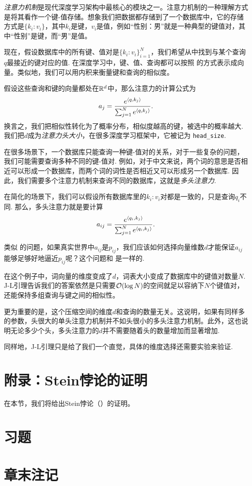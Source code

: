 \begin{example}[多头注意力]
\emph{注意力机制}是现代深度学习架构中最核心的模块之一。注意力机制的一种理解方式是将其看作一个键-值存储。想象我们把数据都存储到了一个数据库中，它的存储方式是$\{k_i:v_i\}$，其中$k_i$是键，$v_i$是值，例如“性别：男”就是一种典型的键值对，其中“性别”是键，而“男”是值。

现在，假设数据库中的所有键、值对是$\{k_i:v_i\}_{i=1}^N$，我们希望从中找到与某个查询$q$最接近的键对应的值. 在深度学习中，键、值、查询都可以按照 的方式表示成向量。类似地，我们可以用内积来衡量键和查询的相似度。

假设这些查询和键的向量都处在$\mathbb{R}^d$中，那么注意力的计算公式为
\[
    a_j = \frac{e^{\left\langle{q},{k_j}\right\rangle}}{\sum_{j=1}^N e^{\left\langle{q},{k_j}\right\rangle}}.
\]
换言之，我们把相似性转化为了概率分布，相似度越高的键，被选中的概率越大. 我们把$d$成为\emph{注意力头大小}，在很多深度学习框架中，它被记为 \verb#head_size#.

在很多场景下，一个数据库只能查询一种键-值对的关系，对于一些复杂的问题，我们可能需要查询多种不同的键-值对. 例如，对于中文来说，两个词的意思是否相近可以形成一个数据库，而两个词的词性是否相近又可以形成另一个数据库. 因此，我们需要多个注意力机制来查询不同的数据库，这就是\emph{多头注意力}.

在简化的场景下，我们可以假设所有数据库里的$k_i:v_i$对都是一致的，只是查询$q_i$不同. 那么，多头注意力就是要计算
\[
    a_{ij} = \frac{e^{\left\langle{q_i},{k_j}\right\rangle}}{\sum_{j=1}^N e^{\left\langle{q_i},{k_j}\right\rangle}}.
\]

类似 的问题，如果真实世界中$a_{ij}$是$p_{ij}$，我们应该如何选择向量维数$d$才能保证$a_{ij}$能够足够好地逼近$p_{ij}$呢？这个问题和 是一样的.

在这个例子中，词向量的维度变成了$d$，词表大小变成了数据库中的键值对数量$N$. J-L引理告诉我们的答案依然是只需要$\mathcal{O}(\log N)$的空间就足以容纳下$N$个键值对，还能保持多组查询与键之间的相似性。

更为重要的是，这个压缩空间的维度$d$和查询的数量无关。这说明，如果有同样多的参数，头很大的单头注意力机制并不如头很小的多头注意力机制。此外，这也说明无论多少个头，多头注意力的$d$并不需要随着头的数量增加而显著增加.

同样地，J-L引理只是给了我们一个直觉，具体的维度选择还需要实验来验证.
\end{example}

\section{附录：Stein悖论的证明}\label{sec:proof-stein-paradox}
在本节，我们将给出Stein悖论（）的证明。


\section{习题}


\section{章末注记}

